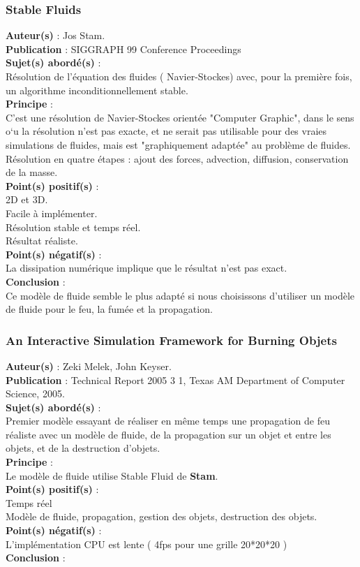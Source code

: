 \documentclass[a4paper,10pt]{article}
\begin{document}
\subsubsection{Stable Fluids}
\textbf{Auteur(s)} : Jos Stam.\\
\textbf{Publication} : SIGGRAPH 99 Conference Proceedings\\
\textbf{Sujet(s) abordé(s)} : \\
Résolution de l'équation des fluides ( Navier-Stockes) avec, pour la première fois, un algorithme inconditionnellement stable.\\
\textbf{Principe} :\\
C'est une résolution de Navier-Stockes orientée "Computer Graphic", dans le sens o`u la résolution n'est pas exacte, et ne serait pas utilisable pour des vraies simulations de fluides, mais est "graphiquement adaptée" au problème de fluides.\\
Résolution en quatre étapes : ajout des forces, advection, diffusion, conservation de la masse.\\
\textbf{Point(s) positif(s)} : \\
2D et 3D.\\
Facile à implémenter.\\
Résolution stable et temps réel.\\
Résultat réaliste.\\
\textbf{Point(s) négatif(s)} :\\
La dissipation numérique implique que le résultat n'est pas exact.\\
\textbf{Conclusion} :\\
Ce modèle de fluide semble le plus adapté si nous choisissons d'utiliser un modèle de fluide pour le feu, la fumée et la propagation.


\subsubsection{An Interactive Simulation Framework for Burning Objets}
\textbf{Auteur(s)} : Zeki Melek, John Keyser.\\
\textbf{Publication} : Technical Report 2005 3 1, Texas AM Department of Computer Science, 2005. \\
\textbf{Sujet(s) abordé(s)} : \\
Premier modèle essayant de réaliser en même temps une propagation
de feu réaliste avec un modèle de fluide, de la propagation sur un objet et entre les objets, et de la destruction
d'objets.\\
\textbf{Principe} :\\	
Le modèle de fluide utilise Stable Fluid de \textbf{Stam}. \\
\textbf{Point(s) positif(s)} :\\
    Temps réel\\
    Modèle de fluide, propagation, gestion des objets, destruction des objets.\\
\textbf{Point(s) négatif(s)} :\\
    L'implémentation CPU est lente ( 4fps pour une grille 20*20*20 )\\      
\textbf{Conclusion} :\\
\end{document}
